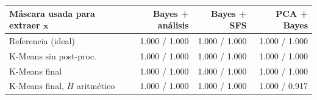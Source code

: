 \footnotesize
\begin{tabular}{lrrr}
\toprule
Máscara usada para extraer $\mathbf{x}$ & Bayes + análisis & Bayes + SFS & PCA + Bayes \\
\midrule
Referencia (ideal) & 1.000 / 1.000 & 1.000 / 1.000 & 1.000 / 1.000 \\
K-Means sin post-proc. & 1.000 / 1.000 & 1.000 / 1.000 & 1.000 / 1.000 \\
K-Means final & 1.000 / 1.000 & 1.000 / 1.000 & 1.000 / 1.000 \\
K-Means final, $\bar H$ aritmético & 1.000 / 1.000 & 1.000 / 1.000 & 1.000 / 0.917 \\
\bottomrule
\end{tabular}
